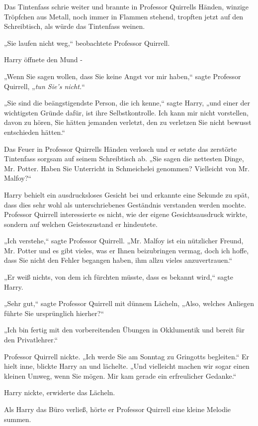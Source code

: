 {Das Tintenfass schrie weiter und brannte in Professor Quirrells Händen, winzige Tröpfchen aus Metall, noch immer in Flammen stehend, tropften jetzt auf den Schreibtisch, als würde das Tintenfass weinen.

„Sie laufen nicht weg,“ beobachtete Professor Quirrell.

Harry öffnete den Mund -

„Wenn Sie sagen wollen, dass Sie keine Angst vor mir haben,“ sagte Professor Quirrell, „\emph{tun Sie's nicht.}“

„Sie sind die beängstigendste Person, die ich kenne,“ sagte Harry, „und einer der wichtigsten Gründe dafür, ist ihre Selbstkontrolle. Ich kann mir nicht vorstellen, davon zu hören, Sie hätten jemanden verletzt, den zu verletzen Sie nicht bewusst entschieden hätten.“

Das Feuer in Professor Quirrells Händen verlosch und er setzte das zerstörte Tintenfass sorgsam auf seinem Schreibtisch ab. „Sie sagen die nettesten Dinge, Mr. Potter. Haben Sie Unterricht in Schmeichelei genommen? Vielleicht von Mr. Malfoy?“

Harry behielt ein ausdrucksloses Gesicht bei und erkannte eine Sekunde zu spät, dass dies sehr wohl als unterschriebenes Geständnis verstanden werden mochte. Professor Quirrell interessierte es nicht, wie der eigene Gesichtsausdruck wirkte, sondern auf welchen Geisteszustand er hindeutete.

„Ich verstehe,“ sagte Professor Quirrell. „Mr. Malfoy ist ein nützlicher Freund, Mr. Potter und es gibt vieles, was er Ihnen beizubringen vermag, doch ich hoffe, dass Sie nicht den Fehler begangen haben, ihm allzu vieles anzuvertrauen.“

„Er weiß nichts, von dem ich fürchten müsste, dass es bekannt wird,“ sagte Harry.

„Sehr gut,“ sagte Professor Quirrell mit dünnem Lächeln, „Also, welches Anliegen führte Sie ursprünglich hierher?“

„Ich bin fertig mit den vorbereitenden Übungen in Okklumentik und bereit für den Privatlehrer.“

Professor Quirrell nickte. „Ich werde Sie am Sonntag zu Gringotts begleiten.“ Er hielt inne, blickte Harry an und lächelte. „Und vielleicht machen wir sogar einen kleinen Umweg, wenn Sie mögen. Mir kam gerade ein erfreulicher Gedanke.“

Harry nickte, erwiderte das Lächeln.

Als Harry das Büro verließ, hörte er Professor Quirrell eine kleine Melodie summen.

}
